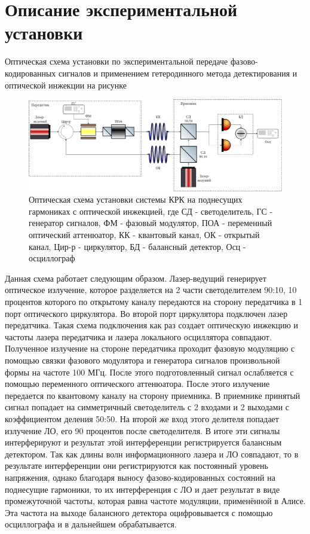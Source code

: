 \section{Описание экспериментальной установки}\label{sec:ch2/sect5}
Оптическая схема установки по экспериментальной передаче фазово-кодированных сигналов и применением гетеродинного метода детектирования и оптической инжекции на рисунке 
\begin{figure}
    \centering
    \includegraphics[width=\linewidth]{images/Схема с обратной связью новая 2 .png}
    \caption{Оптическая схема установки системы КРК на поднесущих гармониках с оптической инжекцией, где СД - светоделитель, ГС - генератор сигналов, ФМ - фазовый модулятор, ПОА - переменный оптический аттенюатор, КК - квантовый канал, ОК - открытый канал, Цир-р - циркулятор, БД - балансный детектор, Осц - осциллограф}
    \label{fig:feedback scheme ch2}
\end{figure}
Данная схема работает следующим образом. Лазер-ведущий генерирует оптическое излучение, которое разделяется на 2 части светоделителем 90:10, 10 процентов которого по открытому каналу передаются на сторону передатчика в 1 порт оптического циркулятора. Во второй порт циркулятора подключен лазер передатчика. Такая схема подключения как раз создает оптическую инжекцию и частоты лазера передатчика и лазера локального осциллятора совпадают. Полученное излучение на стороне передатчика проходит фазовую модуляцию с помощью связки фазового модулятора и генератора сигналов произвольной формы на частоте 100 МГц. После этого подготовленный сигнал ослабляется с помощью переменного оптического аттенюатора. После этого излучение передается по квантовому каналу на сторону приемника. В приемнике принятый сигнал попадает на симметричный светоделитель с 2 входами и 2 выходами с коэффициентом деления 50:50. На второй же вход этого делителя попадает излучение ЛО, его 90 процентов после светоделителя. В итоге эти сигналы интерферируют и результат этой интерференции регистрируется балансным детектором. Так как длины волн информационного лазера и ЛО совпадают, то в результате интерференции они регистрируются как постоянный уровень напряжения, однако благодаря выносу фазово-кодированных состояний на поднесущие гармоники, то их интерференция с ЛО и дает результат в виде промежуточной частоты, которая равна частоте модуляции, применённой в Алисе. Эта частота на выходе балансного детектора оцифровывается с помощью осциллографа и в дальнейшем обрабатывается. 
